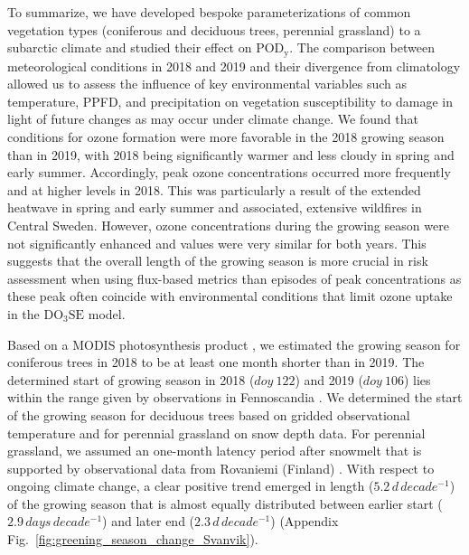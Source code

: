 \documentclass[bg, manuscript]{copernicus}
\begin{document}
To summarize, we have developed bespoke parameterizations of common vegetation types (coniferous and deciduous trees, perennial grassland) to a subarctic climate and studied their effect on $\mathrm{POD_y}$. The comparison between meteorological conditions in 2018 and 2019 and their divergence from climatology allowed us to assess the influence of key environmental variables such as temperature, PPFD, and precipitation on vegetation susceptibility to  damage in light of future changes as may occur under climate change. We found that conditions for ozone formation were more favorable in the 2018 growing season than in 2019, with 2018 being significantly warmer and less cloudy in spring and early summer. Accordingly, peak ozone concentrations occurred more frequently and at higher levels in 2018. This was particularly a result of the extended heatwave in spring and early summer and associated, extensive wildfires in Central Sweden. However, ozone concentrations during the growing season were not significantly enhanced and  values were very similar for both years.
This suggests that the overall length of the growing season is more crucial in risk assessment when using flux-based metrics than episodes of peak concentrations as these peak  often coincide with environmental conditions that limit ozone uptake in the $\mathrm{DO_3SE}$ model.

Based on a MODIS photosynthesis product \citep{MODIS_PSN}, we estimated the growing season for coniferous trees in 2018 to be at least one month shorter than in 2019. The determined start of growing season in 2018 ($\unit{doy}~122$) and 2019 ($\unit{doy}~106$) lies within the range given by observations in Fennoscandia \citep{TB:Kolari2007,IVL:Karlsson2018}. We determined the start of the growing season for deciduous trees based on gridded observational temperature and for perennial grassland on snow depth data. For perennial grassland, we assumed an one-month latency period after snowmelt that is supported by observational data from Rovaniemi (Finland) \citep{FCR:Korhonen2018}. With respect to ongoing climate change, a clear positive trend emerged in length ($5.2\,\unit{d\,decade^{-1}}$) of the growing season that is almost equally distributed between earlier start ($2.9\,\unit{days\,decade^{-1}}$) and later end ($2.3\,\unit{d\,decade^{-1}}$) (Appendix Fig.~\ref{fig:greening_season_change_Svanvik}).
\end{document}
